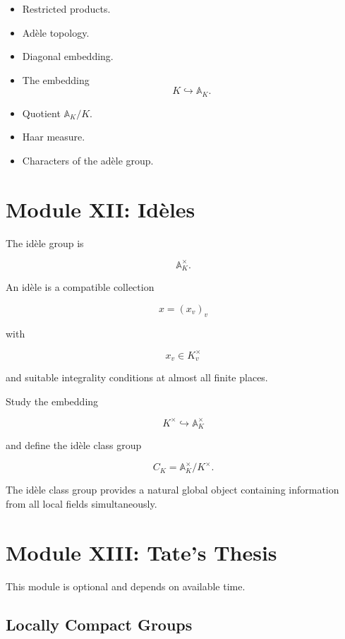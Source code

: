 \documentclass[11pt]{article}
\begin{document}
\begin{itemize}
    \item Restricted products.
    \item Adèle topology.
    \item Diagonal embedding.
    \item The embedding
          \[
          K\hookrightarrow\mathbb{A}_K.
          \]
    \item Quotient $\mathbb{A}_K/K$.
    \item Haar measure.
    \item Characters of the adèle group.
\end{itemize}

\section{Module XII: Idèles}

The idèle group is

\[
\boxed{
\mathbb{A}_K^\times.
}
\]

An idèle is a compatible collection

\[
x=(x_v)_v
\]

with

\[
x_v\in K_v^\times
\]

and suitable integrality conditions at almost all finite places.

Study the embedding

\[
K^\times
\hookrightarrow
\mathbb{A}_K^\times
\]

and define the idèle class group

\[
\boxed{
C_K
=
\mathbb{A}_K^\times/K^\times.
}
\]

The idèle class group provides a natural global object
containing information from all local fields simultaneously.

\section{Module XIII: Tate's Thesis}

This module is optional and depends on available time.

\subsection{Locally Compact Groups}
\end{document}
